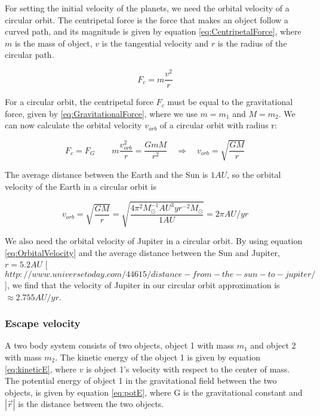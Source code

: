 \documentclass[norsk,a4paper,12pt]{article}
\begin{document}
For setting the initial velocity of the planets, we need the orbital velocity of a circular orbit. The centripetal force is the force that makes an object follow a curved path, and its magnitude is given by equation \ref{eq:CentripetalForce}, where $m$ is the mass of object, $v$ is the tangential velocity and $r$ is the radius of the circular path. 

\begin{equation}
     F_c = m \frac{v^2}{r}
     \label{eq:CentripetalForce}
\end{equation}

For a circular orbit, the centripetal force $F_c$ must be equal to the gravitational force, given by \ref{eq:GravitationalForce}, where we use $m = m_1$ and $M =m_2$. We can now calculate the orbital velocity $v_{orb}$ of a circular orbit with radius r:

\begin{equation}
    F_c = F_G \quad \quad m \frac{v_{orb}^2}{r} = \frac{GmM}{r^2} \quad \Rightarrow \quad v_{orb} = \sqrt{\frac{GM}{r}}
    \label{eq:OrbitalVelocity}
\end{equation}

The average distance between the Earth and the Sun is $1 AU$, so the orbital velocity of the Earth in a circular orbit is

\begin{equation*}
    v_{orb} = \sqrt{\frac{GM}{r}} = \sqrt{\frac{ 4\pi^2 M_{\odot} ^{-1} AU^3 yr^{-2} M_{\odot}}{1 AU}} = 2\pi AU/yr 
\end{equation*}

We also need the orbital velocity of Jupiter in a circular orbit. By using equation \ref{eq:OrbitalVelocity} and the average distance between the Sun and Jupiter, $r = 5.2 AU$ [$http://www.universetoday.com/44615/distance-from-the-sun-to-jupiter/$], we find that the velocity of Jupiter in our circular orbit approximation is $\approx 2.755 AU/yr$.

\subsubsection{Escape velocity}
A two body system consists of two objects, object 1 with mass $m_1$ and object 2 with mass $m_2$. The kinetic energy of the object 1 is given by equation \ref{eq:kineticE}, where $v$ is object 1's velocity with respect to the center of mass. The potential energy of object 1 in the gravitational field between the two objects, is given by equation \ref{eq:potE}, where G is the gravitational constant and $|\vec{r}|$ is the distance between the two objects. 
\end{document}
